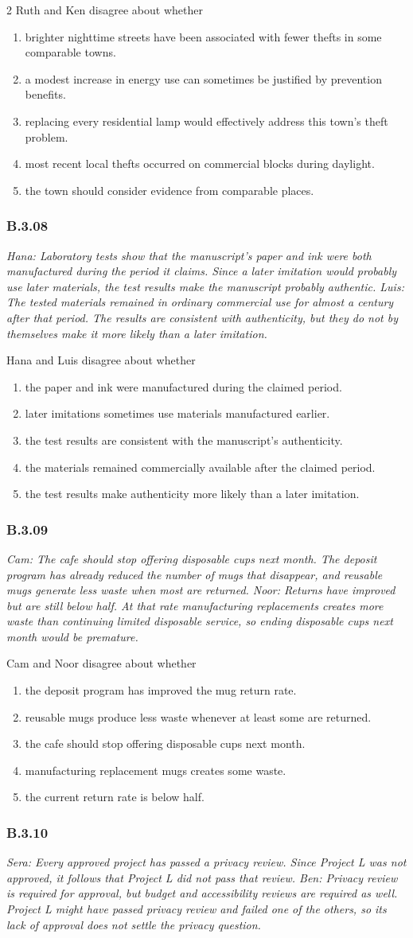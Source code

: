 \documentclass[10pt]{extarticle}
\newcommand{\choice}[1]{\item #1}
\newcommand{\bankitem}[1]{\subsubsection*{#1}}
\begin{document}
\begin{multicols}{2}
Ruth and Ken disagree about whether
\begin{enumerate}[label=(\alph*)]
  \choice{brighter nighttime streets have been associated with fewer thefts in some comparable towns.}
  \choice{a modest increase in energy use can sometimes be justified by prevention benefits.}
  \choice{replacing every residential lamp would effectively address this town's theft problem.}
  \choice{most recent local thefts occurred on commercial blocks during daylight.}
  \choice{the town should consider evidence from comparable places.}
\end{enumerate}
\bankitem{B.3.08}
\emph{Hana: Laboratory tests show that the manuscript's paper and ink were both manufactured during the period it claims. Since a later imitation would probably use later materials, the test results make the manuscript probably authentic. Luis: The tested materials remained in ordinary commercial use for almost a century after that period. The results are consistent with authenticity, but they do not by themselves make it more likely than a later imitation.}

Hana and Luis disagree about whether
\begin{enumerate}[label=(\alph*)]
  \choice{the paper and ink were manufactured during the claimed period.}
  \choice{later imitations sometimes use materials manufactured earlier.}
  \choice{the test results are consistent with the manuscript's authenticity.}
  \choice{the materials remained commercially available after the claimed period.}
  \choice{the test results make authenticity more likely than a later imitation.}
\end{enumerate}
\bankitem{B.3.09}
\emph{Cam: The cafe should stop offering disposable cups next month. The deposit program has already reduced the number of mugs that disappear, and reusable mugs generate less waste when most are returned. Noor: Returns have improved but are still below half. At that rate manufacturing replacements creates more waste than continuing limited disposable service, so ending disposable cups next month would be premature.}

Cam and Noor disagree about whether
\begin{enumerate}[label=(\alph*)]
  \choice{the deposit program has improved the mug return rate.}
  \choice{reusable mugs produce less waste whenever at least some are returned.}
  \choice{the cafe should stop offering disposable cups next month.}
  \choice{manufacturing replacement mugs creates some waste.}
  \choice{the current return rate is below half.}
\end{enumerate}
\bankitem{B.3.10}
\emph{Sera: Every approved project has passed a privacy review. Since Project L was not approved, it follows that Project L did not pass that review. Ben: Privacy review is required for approval, but budget and accessibility reviews are required as well. Project L might have passed privacy review and failed one of the others, so its lack of approval does not settle the privacy question.}


\end{multicols}
\end{document}
